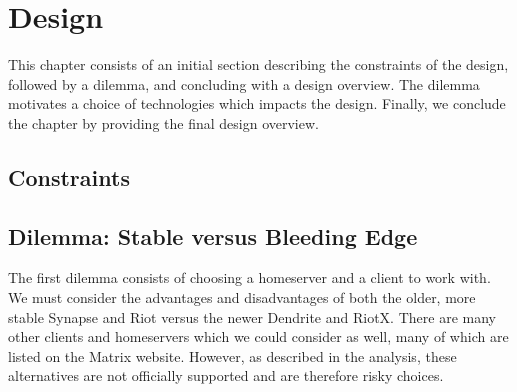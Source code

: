 \chapter{Design}
This chapter consists of an initial section describing the constraints of the design, followed by a dilemma, and concluding with a design overview.
The dilemma motivates a choice of technologies which impacts the design.
Finally, we conclude the chapter by providing the final design overview.

\section{Constraints}


\section{Dilemma: Stable versus Bleeding Edge}
The first dilemma consists of choosing a homeserver and a client to work with.
We must consider the advantages and disadvantages of both the older, more stable Synapse and Riot versus the newer Dendrite and RiotX.
There are many other clients and homeservers which we could consider as well, many of which are listed on the Matrix website.
However, as described in the analysis, these alternatives are not officially supported and are therefore risky choices.

